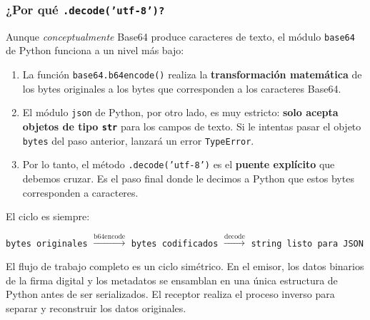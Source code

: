 \begin{note}
\subsubsection*{¿Por qué \texttt{.decode('utf-8')?}}
Aunque \textit{conceptualmente} Base64 produce caracteres de texto, el módulo \texttt{base64} de Python funciona a un nivel más bajo:

\begin{enumerate}
    \item La función \texttt{base64.b64encode()} realiza la \textbf{transformación matemática} de los bytes originales a los bytes que corresponden a los caracteres Base64.
    
    \item El módulo \texttt{json} de Python, por otro lado, es muy estricto: \textbf{solo acepta objetos de tipo \texttt{str}} para los campos de texto. Si le intentas pasar el objeto \texttt{bytes} del paso anterior, lanzará un error \texttt{TypeError}.

    \item Por lo tanto, el método \texttt{.decode('utf-8')} es el \textbf{puente explícito} que debemos cruzar. Es el paso final donde le decimos a Python que estos bytes corresponden a caracteres.
\end{enumerate}

El ciclo es siempre:
\begin{center}
\texttt{bytes originales} $\xrightarrow{\text{b64encode}}$ \texttt{bytes codificados} $\xrightarrow{\text{decode}}$ \texttt{string listo para JSON}
\end{center}
\end{note}

El flujo de trabajo completo es un ciclo simétrico. En el emisor, los datos binarios de la firma digital y los metadatos se ensamblan en una única estructura de Python antes de ser serializados. El receptor realiza el proceso inverso para separar y reconstruir los datos originales.

